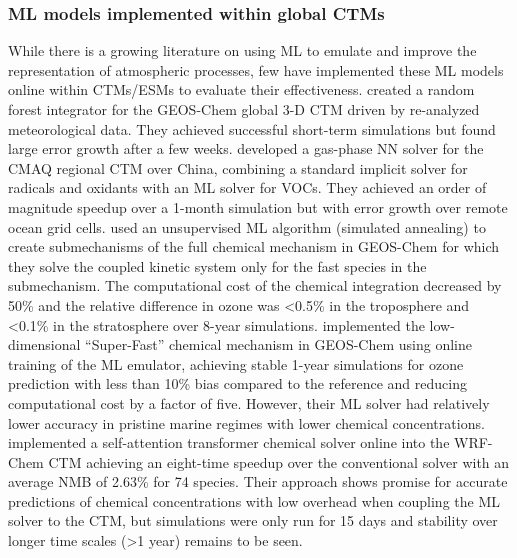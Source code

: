 \documentclass[gmd, manuscript]{copernicus}
\begin{document}
\subsubsection{ML models implemented within global CTMs}
While there is a growing literature on using ML to emulate and improve the representation of atmospheric processes, few have implemented these ML models online within CTMs/ESMs to evaluate their effectiveness. \citet{keller_application_2019} created a random forest integrator for the GEOS-Chem global 3-D CTM driven by re-analyzed meteorological data. They achieved successful short-term simulations but found large error growth after a few weeks. \citet{liu_correcting_2022} developed a gas-phase NN solver for the CMAQ regional CTM over China, combining a standard implicit solver for radicals and oxidants with an ML solver for VOCs. They achieved an order of magnitude speedup over a 1-month simulation but with error growth over remote ocean grid cells. \citet{shen_machine-learning-guided_2022} used an unsupervised ML algorithm (simulated annealing) to create submechanisms of the full chemical mechanism in GEOS-Chem for which they solve the coupled kinetic system only for the fast species in the submechanism. The computational cost of the chemical integration decreased by 50\% and the relative difference in ozone was <0.5\% in the troposphere and <0.1\% in the stratosphere over 8-year simulations. \citet{kelp_online-learned_2022} implemented the low-dimensional “Super-Fast” chemical mechanism in GEOS-Chem using online training of the ML emulator, achieving stable 1-year simulations for ozone prediction with less than 10\% bias compared to the reference and reducing computational cost by a factor of five. However, their ML solver had relatively lower accuracy in pristine marine regimes with lower chemical concentrations. \citet{xia_advancing_2024} implemented a self-attention transformer chemical solver online into the WRF-Chem CTM achieving an eight-time speedup over the conventional solver with an average NMB of 2.63\% for 74 species. Their approach shows promise for accurate predictions of chemical concentrations with low overhead when coupling the ML solver to the CTM, but simulations were only run for 15 days and stability over longer time scales (>1 year) remains to be seen. 
\end{document}
